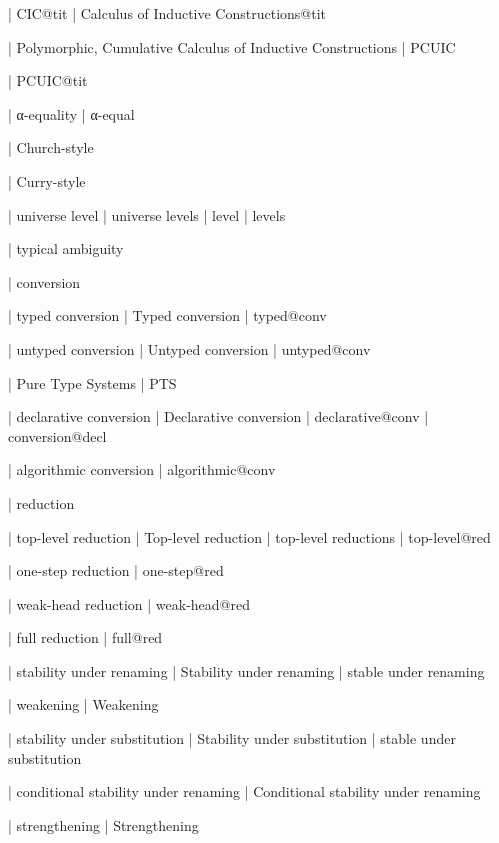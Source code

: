   | CIC@tit
  | Calculus of Inductive Constructions@tit

  | Polymorphic, Cumulative Calculus of Inductive Constructions
  | PCUIC

  | PCUIC@tit

  | α-equality
  | α-equal 

  | Church-style

  | Curry-style

  | universe level
  | universe levels
  | level
  | levels

  | typical ambiguity


  | conversion

  | typed conversion
  | Typed conversion
  | typed@conv

  | untyped conversion
  | Untyped conversion
  | untyped@conv

  | Pure Type Systems
  | PTS

  | declarative conversion
  | Declarative conversion
  | declarative@conv
  | conversion@decl

  | algorithmic conversion
  | algorithmic@conv

  | reduction

  | top-level reduction
  | Top-level reduction
  | top-level reductions
  | top-level@red

  | one-step reduction
  | one-step@red

  | weak-head reduction
  | weak-head@red

  | full reduction
  | full@red

  | stability under renaming
  | Stability under renaming
  | stable under renaming

  | weakening
  | Weakening

  | stability under substitution
  | Stability under substitution
  | stable under substitution

  | conditional stability under renaming
  | Conditional stability under renaming


  | strengthening
  | Strengthening

